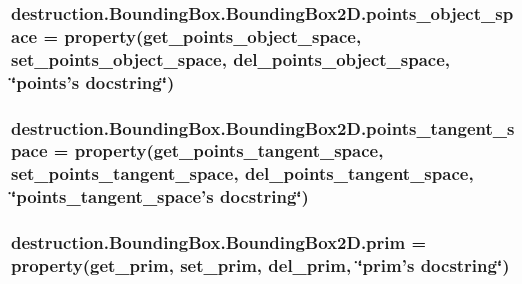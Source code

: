 \hypertarget{classdestruction_1_1_bounding_box_1_1_bounding_box2_d_aaeb25423007a5bf89ef528829cd886c6}{
\subsubsection[{points\-\_\-object\-\_\-space}]{\setlength{\rightskip}{0pt plus 5cm}destruction.\-Bounding\-Box.\-Bounding\-Box2\-D.\-points\-\_\-object\-\_\-space = property({\bf get\-\_\-points\-\_\-object\-\_\-space}, {\bf set\-\_\-points\-\_\-object\-\_\-space}, {\bf del\-\_\-points\-\_\-object\-\_\-space}, \char`\"{}points's docstring\char`\"{})\hspace{0.3cm}{\ttfamily [static]}}}\label{classdestruction_1_1_bounding_box_1_1_bounding_box2_d_aaeb25423007a5bf89ef528829cd886c6}
\hypertarget{classdestruction_1_1_bounding_box_1_1_bounding_box2_d_a8ba9c809b423ee9d9505c1eacdb30fa4}{
\subsubsection[{points\-\_\-tangent\-\_\-space}]{\setlength{\rightskip}{0pt plus 5cm}destruction.\-Bounding\-Box.\-Bounding\-Box2\-D.\-points\-\_\-tangent\-\_\-space = property({\bf get\-\_\-points\-\_\-tangent\-\_\-space}, {\bf set\-\_\-points\-\_\-tangent\-\_\-space}, {\bf del\-\_\-points\-\_\-tangent\-\_\-space}, \char`\"{}points\-\_\-tangent\-\_\-space's docstring\char`\"{})\hspace{0.3cm}{\ttfamily [static]}}}\label{classdestruction_1_1_bounding_box_1_1_bounding_box2_d_a8ba9c809b423ee9d9505c1eacdb30fa4}
\hypertarget{classdestruction_1_1_bounding_box_1_1_bounding_box2_d_a6031065638f7d885c9de613cdeb40354}{
\subsubsection[{prim}]{\setlength{\rightskip}{0pt plus 5cm}destruction.\-Bounding\-Box.\-Bounding\-Box2\-D.\-prim = property({\bf get\-\_\-prim}, {\bf set\-\_\-prim}, {\bf del\-\_\-prim}, \char`\"{}prim's docstring\char`\"{})\hspace{0.3cm}{\ttfamily [static]}}}\label{classdestruction_1_1_bounding_box_1_1_bounding_box2_d_a6031065638f7d885c9de613cdeb40354}
